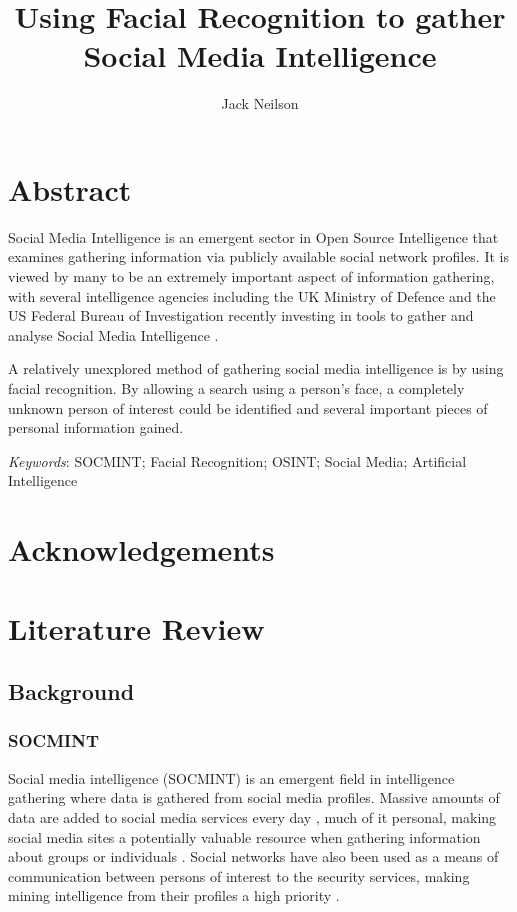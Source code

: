 \documentclass[12pt]{article}
\begin{document}
\title{Using Facial Recognition to gather Social Media Intelligence}
\author{Jack Neilson}
\maketitle
\newpage
\tableofcontents
\newpage

\section{Abstract}
Social Media Intelligence is an emergent sector in Open Source Intelligence that examines gathering information via publicly available social network profiles. It is viewed by many to be an extremely important aspect of information gathering, with several intelligence agencies including the UK Ministry of Defence and the US Federal Bureau of Investigation recently investing in tools to gather and analyse Social Media Intelligence \citep{socmintpublicsafety}.

A relatively unexplored method of gathering social media intelligence is by using facial recognition. By allowing a search using a person's face, a completely unknown person of interest could be identified and several important pieces of personal information gained.

\textit{Keywords}: SOCMINT; Facial Recognition; OSINT; Social Media; Artificial Intelligence


\section{Acknowledgements}
\newpage

\section{Literature Review}
\subsection{Background}
\subsubsection{SOCMINT}
Social media intelligence (SOCMINT) is an emergent field in intelligence gathering where data is gathered from social media profiles. Massive amounts of data are added to social media services every day \citep{socmintoverview}, much of it personal, making social media sites a potentially valuable resource when gathering information about groups or individuals \citep{gchqmasssurveillance}. Social networks have also been used as a means of communication between persons of interest to the security services, making mining intelligence from their profiles a high priority \citep{socmintoverview}\citep{policesocmint}.
\end{document}
